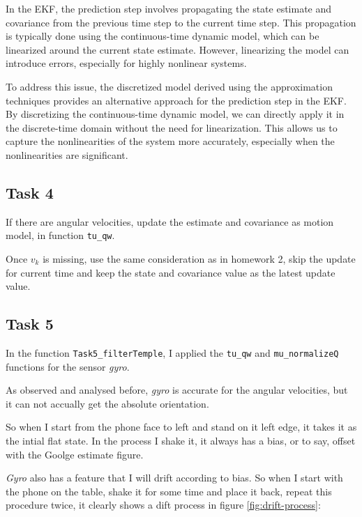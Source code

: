 In the EKF, the prediction step involves propagating the state estimate and covariance from the previous time step to the current time step. This propagation is typically done using the continuous-time dynamic model, which can be linearized around the current state estimate. However, linearizing the model can introduce errors, especially for highly nonlinear systems.

To address this issue, the discretized model derived using the approximation techniques provides an alternative approach for the prediction step in the EKF. By discretizing the continuous-time dynamic model, we can directly apply it in the discrete-time domain without the need for linearization. This allows us to capture the nonlinearities of the system more accurately, especially when the nonlinearities are significant.

\subsection{Task 4}

If there are angular velocities, update the estimate and covariance as motion model, in function \texttt{tu\_qw}.

Once $ v_k $ is missing, use the same consideration as in homework 2, skip the update for current time and keep the state and covariance value as the latest update value.

\subsection{Task 5}

In the function \texttt{Task5\_filterTemple}, I applied the \texttt{tu\_qw} and \texttt{mu\_normalizeQ} functions for the sensor \emph{gyro}.

As observed and analysed before, \emph{gyro} is accurate for the angular velocities, but it can not accually get the absolute orientation.

So when I start from the phone face to left and stand on it left edge, it takes it as the intial flat state. In the process I shake it, it always has a bias, or to say, offset with the Goolge estimate figure.

\emph{Gyro} also has a feature that I will drift according to bias. So when I start with the phone on the table, shake it for some time and place it back, repeat this procedure twice, it clearly shows a dift process in figure \ref{fig:drift-process}:


